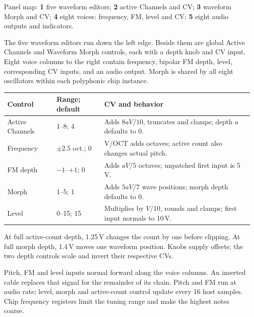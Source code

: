 Panel map: \textbf{1} five waveform editors;
\textbf{2} active Channels and CV;
\textbf{3} waveform Morph and CV;
\textbf{4} eight voices: frequency, FM, level and CV;
\textbf{5} eight audio outputs and indicators.

The five waveform editors run down the left edge. Beside them are global
Active Channels and Waveform Morph controls, each with a depth knob and CV
input. Eight voice columns to the right contain frequency, bipolar FM depth,
level, corresponding CV inputs, and an audio output. Morph is shared by
all eight oscillators within each polyphonic chip instance.

\begin{tabularx}{\textwidth}{@{}l l X@{}}
\toprule Control & Range; default & CV and behavior \\\midrule
Active Channels & 1--8; 4 & Adds $8aV/10$, truncates and clamps; depth $a$ defaults to 0. \\
Frequency & $\pm2.5$ oct.; 0 & V/OCT adds octaves; active count also changes actual pitch. \\
FM depth & $-1$--$+1$; 0 & Adds $aV/5$ octaves; unpatched first input is 5\,V. \\
Morph & 1--5; 1 & Adds $5aV/7$ wave positions; morph depth defaults to 0. \\
Level & 0--15; 15 & Multiplies by $V/10$, rounds and clamps; first input normals to 10\,V. \\
\bottomrule
\end{tabularx}

At full active-count depth, 1.25\,V changes the count by one before clipping.
At full morph depth, 1.4\,V moves one waveform position. Knobs supply offsets;
the two depth controls scale and invert their respective CVs.

Pitch, FM and level inputs normal forward along the voice columns.
An inserted cable replaces that signal for the remainder of its chain.
Pitch and FM run at audio rate; level, morph and active-count control update
every 16 host samples. Chip frequency registers limit the tuning range and
make the highest notes coarse.
